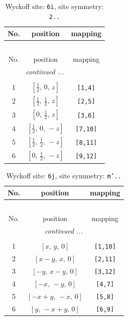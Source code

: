 \documentclass[fleqn,8pt]{jsarticle}
\begin{document}
\renewcommand{\arraystretch}{1.2}
\begin{longtable}{ccc}
\caption{Wyckoff site: {\tt 6i}, site symmetry: {\tt 2..}}
 \\
 \hline \hline
No. & position & mapping \\ \hline \endfirsthead

\multicolumn{2}{l}{\tablename\ \thetable{}} \\
 \hline \hline
No. & position & mapping \\ \hline \endhead

 \hline \hline
\multicolumn{2}{r}{\footnotesize\it continued ...} \\ \endfoot

 \hline \hline
\multicolumn{2}{r}{} \\ \endlastfoot

1 & $\left[ \frac{1}{2},\, 0,\, z \right]$ & {\tt [1,4]} \\ \hline
2 & $\left[ \frac{1}{2},\, \frac{1}{2},\, z \right]$ & {\tt [2,5]} \\ \hline
3 & $\left[ 0,\, \frac{1}{2},\, z \right]$ & {\tt [3,6]} \\ \hline
4 & $\left[ \frac{1}{2},\, 0,\, - z \right]$ & {\tt [7,10]} \\ \hline
5 & $\left[ \frac{1}{2},\, \frac{1}{2},\, - z \right]$ & {\tt [8,11]} \\ \hline
6 & $\left[ 0,\, \frac{1}{2},\, - z \right]$ & {\tt [9,12]} \\
\end{longtable}
\renewcommand{\arraystretch}{1.2}
\begin{longtable}{ccc}
\caption{Wyckoff site: {\tt 6j}, site symmetry: {\tt m'..}}
 \\
 \hline \hline
No. & position & mapping \\ \hline \endfirsthead

\multicolumn{2}{l}{\tablename\ \thetable{}} \\
 \hline \hline
No. & position & mapping \\ \hline \endhead

 \hline \hline
\multicolumn{2}{r}{\footnotesize\it continued ...} \\ \endfoot

 \hline \hline
\multicolumn{2}{r}{} \\ \endlastfoot

1 & $\left[ x,\, y,\, 0 \right]$ & {\tt [1,10]} \\ \hline
2 & $\left[ x - y,\, x,\, 0 \right]$ & {\tt [2,11]} \\ \hline
3 & $\left[ - y,\, x - y,\, 0 \right]$ & {\tt [3,12]} \\ \hline
4 & $\left[ - x,\, - y,\, 0 \right]$ & {\tt [4,7]} \\ \hline
5 & $\left[ - x + y,\, - x,\, 0 \right]$ & {\tt [5,8]} \\ \hline
6 & $\left[ y,\, - x + y,\, 0 \right]$ & {\tt [6,9]} \\
\end{longtable}
\end{document}
